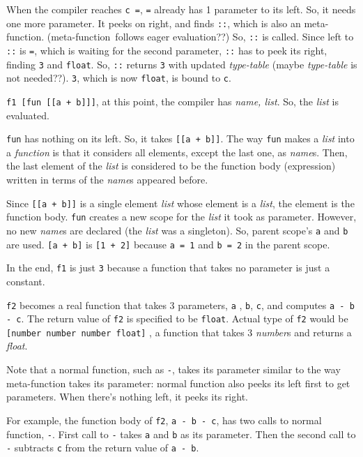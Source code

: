 \documentclass[12pt,letterpaper,notitlepage]{article}
\newcommand{\op}{meta-function}
\begin{document}
When the compiler reaches \verb!c =!, \verb!=! already has 1 parameter
to its left. So, it needs one more parameter.
It peeks on right, and finds \verb!::!, which is also an \op .
(\op\ follows eager evaluation??)
So, \verb!::! is called. Since left to \verb!::! is \verb!=!, which is
waiting for the second parameter, \verb!::! has to peek its right, finding
\verb!3! and \verb!float!. So, \verb!::! returns \verb!3!
with updated \emph{type-table} (maybe \emph{type-table} is not needed??).
\verb!3!, which is now \verb!float!, is bound to \verb!c!.

\verb!f1 [fun [[a + b]]]!, at this point, the compiler has
\emph{name, list}. So, the \emph{list} is evaluated.

\verb!fun! has nothing on its left. So, it takes \verb![[a + b]]!.
The way \verb!fun! makes a \emph{list} into a \emph{function} is that
it considers all elements, except the last one, as \emph{name}s.
Then, the last element of the \emph{list} is considered to be
the function body (expression) written in terms of the \emph{name}s
appeared before.

Since \verb![[a + b]]! is a single element \emph{list} whose
element is a \emph{list}, the element is the function body.
\verb!fun! creates a new scope for the \emph{list} it took as parameter.
However, no new \emph{name}s are declared (the \emph{list} was a singleton).
So, parent scope's \verb!a! and \verb!b! are used.
\verb![a + b]! is \verb![1 + 2]! because \verb!a = 1! and \verb!b = 2!
in the parent scope.

In the end, \verb!f1! is just \verb!3! because a function that takes
no parameter is just a constant.

\verb!f2! becomes a real function that takes 3 parameters, \verb!a!
, \verb!b!, \verb!c!,  and computes \verb!a - b - c!.
The return value of \verb!f2! is specified to be \verb!float!.
Actual type of \verb!f2! would be \verb![number number number float]!
, a function that takes 3 \emph{number}s and returns a \emph{float}.

Note that a normal function, such as \verb!-!, takes its parameter
similar to the way meta-function takes its parameter:
normal function also peeks its left first to get parameters.
When there's nothing left, it peeks its right.

For example, the function body of \verb!f2!, \verb!a - b - c!,
has two calls to normal function, \verb!-!. First call to \verb!-!
takes \verb!a! and \verb!b! as its parameter.
Then the second call to \verb!-! subtracts \verb!c! from
the return value of \verb!a - b!.
\end{document}
